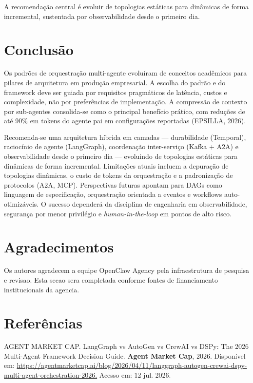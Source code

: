\documentclass[12pt,a4paper]{article}
\begin{document}
A recomendação central é evoluir de topologias estáticas para dinâmicas de forma incremental, sustentada por observabilidade desde o primeiro dia.


\section{Conclusão}

Os padrões de orquestração multi-agente evoluíram de conceitos acadêmicos para pilares de arquitetura em produção empresarial. A escolha do padrão e do framework deve ser guiada por requisitos pragmáticos de latência, custos e complexidade, não por preferências de implementação. A compressão de contexto por sub-agentes consolida-se como o principal benefício prático, com reduções de até 90\% em tokens do agente pai em configurações reportadas (EPSILLA, 2026).

Recomenda-se uma arquitetura híbrida em camadas — durabilidade (Temporal), raciocínio de agente (LangGraph), coordenação inter-serviço (Kafka + A2A) e observabilidade desde o primeiro dia — evoluindo de topologias estáticas para dinâmicas de forma incremental. Limitações atuais incluem a depuração de topologias dinâmicas, o custo de tokens da orquestração e a padronização de protocolos (A2A, MCP). Perspectivas futuras apontam para DAGs como linguagem de especificação, orquestração orientada a eventos e workflows auto-otimizáveis. O sucesso dependerá da disciplina de engenharia em observabilidade, segurança por menor privilégio e \textit{human-in-the-loop} em pontos de alto risco.


\section*{Agradecimentos}

Os autores agradecem a equipe OpenClaw Agency pela infraestrutura de pesquisa e revisao. Esta secao sera completada conforme fontes de financiamento institucionais da agencia.


\section*{Referências}

AGENT MARKET CAP. LangGraph vs AutoGen vs CrewAI vs DSPy: The 2026 Multi-Agent Framework Decision Guide. \textbf{Agent Market Cap}, 2026. Disponível em: \url{https://agentmarketcap.ai/blog/2026/04/11/langgraph-autogen-crewai-dspy-multi-agent-orchestration-2026.} Acesso em: 12 jul. 2026.
\end{document}
